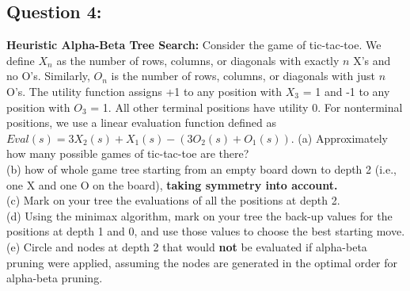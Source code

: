 \documentclass{article}
\begin{document}
\subsection*{Question 4:}
\textbf{Heuristic Alpha-Beta Tree Search:} Consider the game of tic-tac-toe. We
define $X_n$ as the number of rows, columns, or diagonals with exactly $n $ X's and no O's. Similarly, $O_n$ is the number of rows, columns, or diagonals with just $n$ O's. The utility function assigns +1 to any position with $X_3$ = 1 and -1 to any position with $O_3$ = 1. All other terminal positions have utility 0. For nonterminal positions, we use a linear evaluation function defined as $Eval(s) = 3X_2(s) + X_1(s) - (3O_2(s) + O_1(s))$.
(a) Approximately how many possible games of tic-tac-toe are there?
\\
(b) how of whole game tree starting from an empty board down to depth 2 (i.e., one X
and one O on the board), \textbf{taking symmetry into account.}
\\
(c) Mark on your tree the evaluations of all the positions at depth 2.
\\
(d) Using the minimax algorithm, mark on your tree the back-up values for the positions at depth 1 and 0, and use those values to choose the best starting move.
\\
(e) Circle and nodes at depth 2 that would \textbf{not} be evaluated if alpha-beta pruning were applied, assuming the nodes are generated in the optimal order for alpha-beta pruning.
\end{document}
